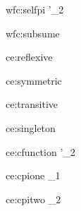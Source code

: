 \documentclass{article}
\theoremstyle{break}
\begin{document}
  {wfc:selfpi}
  {\validconstructor{\context}{\constructor}
                       {}\qquad
                       {\capply{\constructor}{\cvar}}{\kind'_2}}
  {\validconstructor{\context}{\constructor}
                       {}}

  {wfc:subsume}
  {\validconstructor{\context}{\constructor}{\kind}\qquad
     }
  {}

  {}

  {ce:reflexive}
  {\validconstructor{\context}{\constructor}{\kind}}
  {\equivconstructor{\context}{\constructor}{\constructor}{\kind}}

  {ce:symmetric}
  {}
  {}

  {ce:transitive}
  {\qquad
   }
  {}

  {ce:singleton}
  {\validconstructor{\context}{\constructor}
     {}}
  {}

  {ce:cfunction}
  {
     {\constructor}{\constructor'}{\kind_2}}
  {\equivconstructor{\context}
     {}
     {}
     {}}

  {ce:cpione}
  {
     {}}
  {\equivconstructor{\context}
     {}{}{\kind_1}}

  {ce:cpitwo}
  {
     {}}
  {\equivconstructor{\context}
     {}{}
     {\kind_2}}
\end{document}
